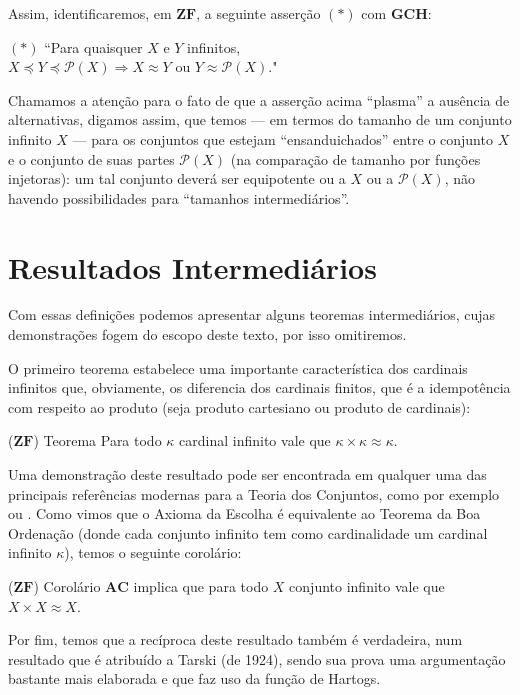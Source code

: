 \documentclass{hipatia}
\newcommand{\partes}[1]{\mathcal{P}(#1)}
\newcommand{\gch}{\mathbf{GCH}}
\newcommand{\ac}{\mathbf{AC}}
\newcommand{\zf}{\mathbf{ZF}}
\begin{document}
Assim, identificaremos,  em $\zf$,  a seguinte asserção
$(\ast)$ com $\gch$: \begin{center} $(\ast)$ ``Para
quaisquer $X$ e $Y$ infinitos, \\$X \preccurlyeq Y
\preccurlyeq\mathcal{P}(X)\Longrightarrow X \approx Y$ ou
$Y \approx \mathcal{P}(X)$." \end{center}

Chamamos a atenção para o fato de que a asserção acima
``plasma'' a ausência de alternativas, digamos assim,  que
temos --- em termos do tamanho de um conjunto infinito $X$
--- para os conjuntos que estejam ``ensanduichados'' entre
o conjunto $X$  e o conjunto de suas partes $\partes{X}$
(na comparação de tamanho por funções injetoras): um tal
conjunto deverá ser equipotente ou a $X$ ou a
$\partes{X}$, não havendo possibilidades para ``tamanhos
intermediários''. 


\section{Resultados Intermediários}

Com essas definições podemos apresentar alguns teoremas
intermediários, cujas demonstrações fogem do escopo deste
texto, por isso omitiremos.

O primeiro teorema estabelece uma importante
característica dos cardinais infinitos que, obviamente, os
diferencia dos cardinais finitos, que é a idempotência com
respeito ao produto (seja produto cartesiano ou produto de
cardinais):

\begin{teoremacaixa*}{($\zf$) Teorema} Para todo $\kappa$
cardinal infinito vale que
$\kappa\times\kappa\approx\kappa$. \end{teoremacaixa*}

Uma demonstração deste resultado pode ser encontrada em
qualquer uma das principais referências modernas para a
Teoria dos Conjuntos, como por exemplo \cite{Jech} ou
\cite{Kunen}. Como vimos que o Axioma da Escolha é
equivalente ao Teorema da Boa Ordenação (donde cada
conjunto infinito tem como cardinalidade um cardinal
infinito $\kappa$), temos o seguinte corolário:

\begin{teoremacaixa*}{($\zf$) Corolário} $\ac$ implica que
para todo $X$ conjunto infinito vale que $X\times X\approx
X$. \end{teoremacaixa*}

Por fim, temos que a recíproca deste resultado também é
verdadeira, num resultado que é atribuído a Tarski (de
1924), sendo sua prova uma argumentação bastante mais
elaborada e que faz uso da função de Hartogs.
\end{document}
